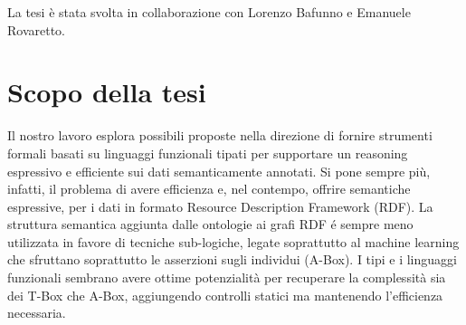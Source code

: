 La tesi è stata svolta in collaborazione con Lorenzo Bafunno e Emanuele Rovaretto.


\section{Scopo della tesi}
Il nostro lavoro esplora possibili proposte nella direzione di fornire strumenti formali basati su linguaggi funzionali tipati per supportare un reasoning
espressivo e efficiente sui dati semanticamente annotati. Si pone sempre più, infatti, il problema di avere efficienza e, nel contempo, offrire semantiche 
espressive, per i dati in formato Resource Description Framework (RDF). La struttura semantica aggiunta dalle ontologie ai grafi RDF \'e sempre meno utilizzata
in favore di tecniche sub-logiche, legate soprattutto al machine learning che sfruttano soprattutto le asserzioni sugli individui (A-Box). 
I tipi e i linguaggi funzionali sembrano avere ottime potenzialità per recuperare la complessità sia dei T-Box che A-Box, aggiungendo controlli statici
ma mantenendo l'efficienza necessaria.
